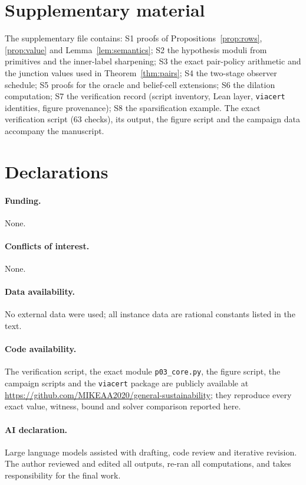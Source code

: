 \documentclass[11pt,a4paper]{article}
\theoremstyle{plain}
\theoremstyle{definition}
\theoremstyle{remark}
\begin{document}
\section*{Supplementary material}
The supplementary file  contains: S1 proofs of Propositions~\ref{prop:rows}, \ref{prop:value} and Lemma~\ref{lem:semantics}; S2 the hypothesis moduli from primitives and the inner-label sharpening; S3 the exact pair-policy arithmetic and the junction values used in Theorem~\ref{thm:pairs}; S4 the two-stage observer schedule; S5 proofs for the oracle and belief-cell extensions; S6 the dilation computation; S7 the verification record (script inventory, Lean layer, \texttt{viacert} identities, figure provenance); S8 the sparsification example. The exact verification script  (63 checks), its output, the figure script and the campaign data accompany the manuscript.

\section*{Declarations}
\paragraph{Funding.} None.
\paragraph{Conflicts of interest.} None.
\paragraph{Data availability.} No external data were used; all instance data are rational constants listed in the text.
\paragraph{Code availability.} The verification script, the exact module \texttt{p03\_core.py}, the figure script, the campaign scripts and the \texttt{viacert} package are publicly available at \url{https://github.com/MIKEAA2020/general-sustainability}; they reproduce every exact value, witness, bound and solver comparison reported here.
\paragraph{AI declaration.} Large language models assisted with drafting, code review and iterative revision. The author reviewed and edited all outputs, re-ran all computations, and takes responsibility for the final work.
\end{document}
